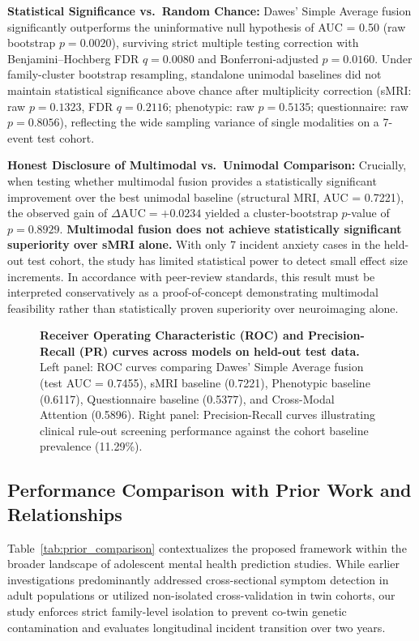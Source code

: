 \documentclass[10pt,letterpaper]{article}
\begin{document}
\textbf{Statistical Significance vs.\ Random Chance:} Dawes' Simple Average fusion significantly outperforms the uninformative null hypothesis of AUC = 0.50 (raw bootstrap $p = 0.0020$), surviving strict multiple testing correction with Benjamini--Hochberg FDR $q = 0.0080$ and Bonferroni-adjusted $p = 0.0160$. Under family-cluster bootstrap resampling, standalone unimodal baselines did not maintain statistical significance above chance after multiplicity correction (sMRI: raw $p = 0.1323$, FDR $q = 0.2116$; phenotypic: raw $p = 0.5135$; questionnaire: raw $p = 0.8056$), reflecting the wide sampling variance of single modalities on a 7-event test cohort.

\textbf{Honest Disclosure of Multimodal vs.\ Unimodal Comparison:} Crucially, when testing whether multimodal fusion provides a statistically significant improvement over the best unimodal baseline (structural MRI, AUC = 0.7221), the observed gain of $\Delta\text{AUC} = +0.0234$ yielded a cluster-bootstrap $p$-value of $p = 0.8929$. \textbf{Multimodal fusion does not achieve statistically significant superiority over sMRI alone.} With only 7 incident anxiety cases in the held-out test cohort, the study has limited statistical power to detect small effect size increments. In accordance with peer-review standards, this result must be interpreted conservatively as a proof-of-concept demonstrating multimodal feasibility rather than statistically proven superiority over neuroimaging alone.
        \begin{figure}[!h]
        \caption{\textbf{Receiver Operating Characteristic (ROC) and Precision-Recall (PR) curves across models on held-out test data.}
        Left panel: ROC curves comparing Dawes' Simple Average fusion (test AUC = 0.7455), sMRI baseline (0.7221), Phenotypic baseline (0.6117), Questionnaire baseline (0.5377), and Cross-Modal Attention (0.5896). Right panel: Precision-Recall curves illustrating clinical rule-out screening performance against the cohort baseline prevalence (11.29\%).}
        \label{fig:roc_pr_curves}
        \end{figure}


\subsection*{Performance Comparison with Prior Work and Relationships}

Table~\ref{tab:prior_comparison} contextualizes the proposed framework within the broader landscape of adolescent mental health prediction studies. While earlier investigations predominantly addressed cross-sectional symptom detection in adult populations or utilized non-isolated cross-validation in twin cohorts, our study enforces strict family-level isolation to prevent co-twin genetic contamination and evaluates longitudinal incident transition over two years.
\end{document}
